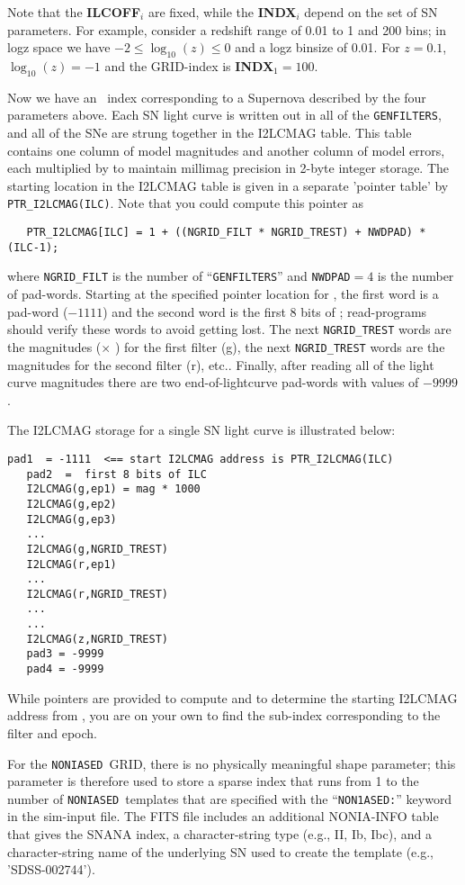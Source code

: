 \documentclass[12pt]{article}
\newcommand{\NONIA}{{\tt NONIASED}}
\begin{document}
Note that the {\bf ILCOFF}$_i$ are fixed,
while the {\bf INDX}$_i$ depend on the set of SN parameters.
For example, consider a redshift range of 0.01 to 1
and 200 bins; in logz space we have $-2 \le \log_{10}(z) \le 0$
and a logz binsize of 0.01.
For $z=0.1$, $\log_{10}(z) = -1$ and the GRID-index is
{\bf INDX}$_{1} = 100$.


Now we have an \ILC\ index corresponding to a Supernova described 
by the four parameters above. Each SN light curve is written out
in all of the {\tt GENFILTERS}, and all of the SNe are strung together
in the I2LCMAG table. This table contains one column of
model magnitudes and another column of model errors, 
each multiplied by {\MAGPACK} to maintain millimag precision 
in 2-byte integer storage.
The starting location in the I2LCMAG table
is given in a separate 'pointer table' by {\tt PTR\_I2LCMAG(ILC)}.
Note that you could compute this pointer as
%
\begin{verbatim}
   PTR_I2LCMAG[ILC] = 1 + ((NGRID_FILT * NGRID_TREST) + NWDPAD) * (ILC-1);
\end{verbatim}
%
where {\tt NGRID\_FILT} is the number of ``{\tt GENFILTERS}''
and {\tt NWDPAD}$=4$ is the number of pad-words.
Starting at the specified pointer location for {\ILC},
the first word is a pad-word ($-1111$) and the second word
is the first 8 bits of {\ILC}; read-programs should verify these
words to avoid getting lost.
The next {\tt NGRID\_TREST} words are the magnitudes 
($\times$ {\MAGPACK})
for the first filter (g), the next {\tt NGRID\_TREST} words are
the magnitudes for the second filter (r), etc..
Finally, after reading all of the light curve magnitudes there
are two end-of-lightcurve pad-words with values of $-9999$.


The I2LCMAG  storage for a single SN light curve 
is illustrated below:
%
\begin{Verbatim}[frame=single]
   pad1  = -1111  <== start I2LCMAG address is PTR_I2LCMAG(ILC)
   pad2  =  first 8 bits of ILC
   I2LCMAG(g,ep1) = mag * 1000
   I2LCMAG(g,ep2)
   I2LCMAG(g,ep3)
   ...
   I2LCMAG(g,NGRID_TREST)
   I2LCMAG(r,ep1)
   ...
   I2LCMAG(r,NGRID_TREST)
   ...
   ...
   I2LCMAG(z,NGRID_TREST) 
   pad3 = -9999
   pad4 = -9999
\end{Verbatim}
%
While pointers are provided to compute {\ILC}
and to determine the starting I2LCMAG address from {\ILC},
you are on your own to find the sub-index 
corresponding to the filter and epoch.

\bigskip
For the \NONIA\ GRID, there is no physically meaningful 
shape parameter; this parameter is therefore used 
to store a sparse index that runs from 1 to the number 
of \NONIA\ templates that are specified with the 
``{\tt NON1ASED:}''  keyword in the sim-input file.
The FITS file includes an additional NONIA-INFO table that gives
the SNANA index, a character-string type (e.g., II, Ib, Ibc),
and a character-string name of the underlying SN used to 
create the template (e.g., 'SDSS-002744').
\end{document}

